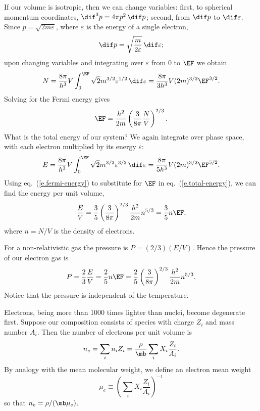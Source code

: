 If our volume is isotropic, then we can change variables: first, to spherical momentum coordinates, $\dif^{3}p = 4\pi p^{2}\,\dif p$; second, from $\dif p$ to $\dif\varepsilon$.  Since $p = \sqrt{2m\varepsilon}$, where $\varepsilon$ is the energy of a single electron,
\[
	\dif p = \sqrt{\frac{m}{2\varepsilon}}\,\dif \varepsilon;
\]
upon changing variables and integrating over $\varepsilon$ from $0$ to $\EF$ we obtain
\[
	N = \frac{8\pi}{h^{3}}V \int_{0}^{\EF} \sqrt{2}m^{3/2}\varepsilon^{1/2}\,\dif \varepsilon
	= \frac{8\pi}{3h^{3}} V (2m)^{3/2} \EF^{3/2}.
\]
Solving for the Fermi energy gives
\begin{equation}\label{e.fermi-energy}
	\EF = \frac{h^{2}}{2m}\left(\frac{3}{8\pi}\frac{N}{V}\right)^{2/3}.
\end{equation}
What is the total energy of our system? We again integrate over phase space, with each electron multiplied by its energy $\varepsilon$:
\begin{equation}\label{e.total-energy}
	E = \frac{8\pi}{h^{3}}V\int_{0}^{\EF}\sqrt{2}m^{3/2}\varepsilon^{3/2}\,\dif\varepsilon = \frac{8\pi}{5h^{3}}V(2m)^{3/2} \EF^{5/2}.
\end{equation}
Using eq.~(\ref{e.fermi-energy}) to substitute for $\EF$ in eq.~(\ref{e.total-energy}), we can find the energy per unit volume,
\[
	\frac{E}{V} = \frac{3}{5}\left(\frac{3}{8\pi}\right)^{2/3}\frac{h^{2}}{2m}n^{5/3} = \frac{3}{5} n \EF,
\]
where $n=N/V$ is the density of electrons.

For a non-relativistic gas the pressure is $P = (2/3)(E/V)$.  Hence the pressure of our electron gas is
\begin{equation}\label{e.pressure-electrons}
	P = \frac{2}{3}\frac{E}{V} = \frac{2}{5} n\EF
		= \frac{2}{5}\left(\frac{3}{8\pi}\right)^{2/3}\frac{h^{2}}{2m}n^{5/3}.
\end{equation}
Notice that the pressure is independent of the temperature.

Electrons, being more than 1000 times lighter than nuclei, become degenerate first. Suppose our composition consists of species with charge $Z_{i}$ and mass number $A_{i}$. Then the number of electrons per unit volume is
\[
	n_{e} = \sum_{i} n_{i} Z_{i} = \frac{\rho}{\mb}\sum_{i} X_{i}\frac{Z_{i}}{A_{i}}.
\]
By analogy with the mean molecular weight, we define an electron mean weight
\begin{equation}\label{e.electron-mean-weight}
\mu_{e} \equiv \left(\sum_{i}X_{i}\frac{Z_{i}}{A_{i}}\right)^{-1}
\end{equation}
so that $n_{e} = \rho/(\mb\mu_{e})$.

